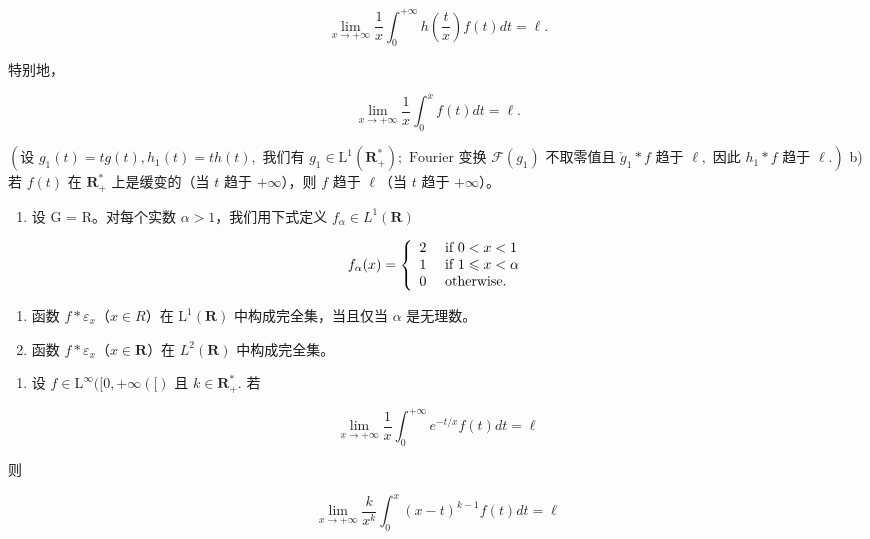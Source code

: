\[
\lim _ {x \to + \infty} \frac {1}{x} \int_ {0} ^ {+ \infty} h \left(\frac {t}{x}\right) f (t) d t = \ell .
\]

特别地，

\[
\lim _ {x \rightarrow + \infty} \frac {1}{x} \int_ {0} ^ {x} f (t) d t = \ell .
\]

\((\text{设 } g_1(t) = tg(t), h_1(t) = th(t), \text{ 我们有 } g_1 \in \mathrm{L}^1(\mathbf{R}_+^*) ; \text{ Fourier 变换 } \mathcal{F}(g_1) \text{ 不取零值且 } \check{g}_1 * f \text{ 趋于 } \ell, \text{ 因此 } h_1 * f \text{ 趋于 } \ell.)\) b) 若 \(f(t)\) 在 \(\mathbf{R}_+^*\) 上是缓变的（当 \(t\) 趋于 \(+\infty\)），则 \(f\) 趋于 \(\ell\)（当 \(t\) 趋于 \(+\infty\)）。

\begin{enumerate}
\def\labelenumi{\arabic{enumi})}
\setcounter{enumi}{3}
\tightlist
\item
  设 G = R。对每个实数 \(\alpha > 1\)，我们用下式定义 \(f_{\alpha} \in L^{1}(\mathbf{R})\)
\end{enumerate}

\[
f _ {\alpha} (x) = \left\{ \begin{array}{l l} 2 & \text { if } 0 <   x <   1 \\ 1 & \text { if } 1 \leqslant x <   \alpha \\ 0 & \text { otherwise. } \end{array} \right.
\]

\begin{enumerate}
\def\labelenumi{\alph{enumi})}
\item
  函数 \(f * \varepsilon_{x}\)（\(x \in R\)）在 \(\mathrm{L}^{1}(\mathbf{R})\) 中构成完全集，当且仅当 \(\alpha\) 是无理数。
\item
  函数 \(f * \varepsilon_x\)（\(x \in \mathbf{R}\)）在 \(L^2(\mathbf{R})\) 中构成完全集。
\end{enumerate}

\begin{enumerate}
\def\labelenumi{\arabic{enumi})}
\setcounter{enumi}{4}
\tightlist
\item
  设 \(f \in \mathrm{L}^{\infty}([0, +\infty([)\text{ 且 } k \in \mathbf{R}_{+}^{*}. \text{ 若}\)
\end{enumerate}

\[
\lim _ {x \to + \infty} \frac {1}{x} \int_ {0} ^ {+ \infty} e ^ {- t / x} f (t) d t = \ell
\]

则

\[
\lim _ {x \rightarrow + \infty} \frac {k}{x ^ {k}} \int_ {0} ^ {x} (x - t) ^ {k - 1} f (t) d t = \ell
\]

